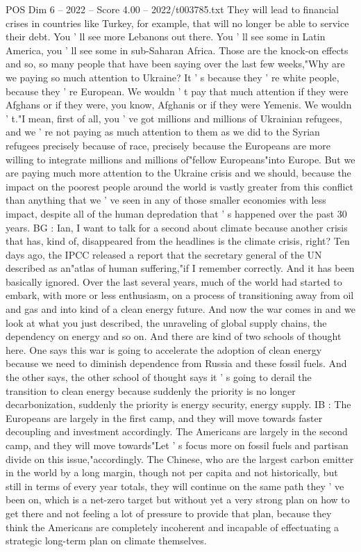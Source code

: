 \begin{textsample}{POS Dim 6 – 2022 – Score 4.00 – 2022/t003785.txt}
They will lead to financial crises in countries like Turkey, for example, that will no longer be able to service their debt.
You ' ll see more Lebanons out there.
You ' ll see some in Latin America, you ' ll see some in sub-Saharan Africa.
Those are the knock-on effects and so, so many people that have been saying over the last few weeks,"Why are we paying so much attention to Ukraine?
It ' s because they ' re white people, because they ' re European.
We wouldn ' t pay that much attention if they were Afghans or if they were, you know, Afghanis or if they were Yemenis.
We wouldn ' t."I mean, first of all, you ' ve got millions and millions of Ukrainian refugees, and we ' re not paying as much attention to them as we did to the Syrian refugees precisely because of race, precisely because the Europeans are more willing to integrate millions and millions of"fellow Europeans"into Europe.
But we are paying much more attention to the Ukraine crisis and we should, because the impact on the poorest people around the world is vastly greater from this conflict than anything that we ' ve seen in any of those smaller economies with less impact, despite all of the human depredation that ' s happened over the past 30 years.
BG : Ian, I want to talk for a second about climate because another crisis that has, kind of, disappeared from the headlines is the climate crisis, right?
Ten days ago, the IPCC released a report that the secretary general of the UN described as an"atlas of human suffering,"if I remember correctly.
And it has been basically ignored.
Over the last several years, much of the world had started to embark, with more or less enthusiasm, on a process of transitioning away from oil and gas and into kind of a clean energy future.
And now the war comes in and we look at what you just described, the unraveling of global supply chains, the dependency on energy and so on.
And there are kind of two schools of thought here.
One says this war is going to accelerate the adoption of clean energy because we need to diminish dependence from Russia and these fossil fuels.
And the other says, the other school of thought says it ' s going to derail the transition to clean energy because suddenly the priority is no longer decarbonization, suddenly the priority is energy security, energy supply.
IB : The Europeans are largely in the first camp, and they will move towards faster decoupling and investment accordingly.
The Americans are largely in the second camp, and they will move towards"Let ' s focus more on fossil fuels and partisan divide on this issue,"accordingly.
The Chinese, who are the largest carbon emitter in the world by a long margin, though not per capita and not historically, but still in terms of every year totals, they will continue on the same path they ' ve been on, which is a net-zero target but without yet a very strong plan on how to get there and not feeling a lot of pressure to provide that plan, because they think the Americans are completely incoherent and incapable of effectuating a strategic long-term plan on climate themselves.

\end{textsample}
